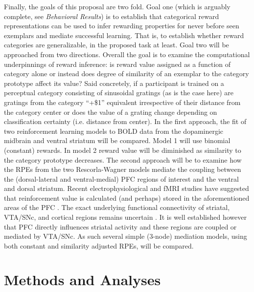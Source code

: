 \documentclass[doc,12pt]{apa}        %
\begin{document}
Finally, the goals of this proposal are two fold.  Goal one (which is arguably complete, see \emph{Behavioral Results}) is to establish that categorical reward representations can be used to infer rewarding properties for never before seen exemplars and mediate successful learning.  That is, to establish whether reward categories are generalizable, in the proposed task at least.  Goal two will be approached from two directions.  Overall the goal is to examine the computational underpinnings of reward inference: is reward value assigned as a function of category alone or instead does degree of similarity of an exemplar to the category prototype affect its value? Said concretely, if a participant is trained on a perceptual category consisting of sinusoidal gratings (as is the case here) are gratings from the category ``+\$1'' equivalent irrespective of their distance from the category center or does the value of a grating change depending on classification certainty (i.e. distance from center).  In the first approach, the fit of two reinforcement learning models to BOLD data from the dopaminergic midbrain and ventral striatum will be compared.  Model 1 will use binomial (constant) rewards. In model 2 reward value will be diminished as similarity to the category prototype decreases.  The second approach will be to examine how the RPEs from the two Rescorla-Wagner models mediate the coupling between the (dorsal-lateral and ventral-medial) PFC regions of interest and the ventral and dorsal striatum.  Recent electrophysiological and fMRI studies have suggested that reinforcement value is calculated (and perhaps) stored in the aforementioned areas of the PFC \cite{Daw:2011p7995,Bornstein:2011p7996,Frank:2011p8152,OReilly:2010p7612,OReilly:2006p1161,OReilly:2006p2615}.  The exact underlying functional connectivity of striatal, VTA/SNc, and cortical regions remains uncertain \cite{Daw:2011p7995,Bornstein:2011p7996,Frank:2011p8152}.  It is well established however that PFC directly influences striatal activity and these regions are coupled or mediated by VTA/SNc.   As such several simple (3-node) mediation models, using both constant and similarity adjusted RPEs, will be compared.

\section{Methods and Analyses} %
\label{sec:methods}
\end{document}
